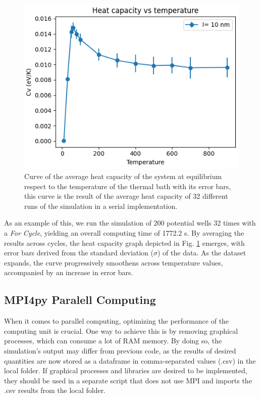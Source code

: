 \documentclass[%
 reprint,
 amsmath,amssymb,
 aps,
]{revtex4-2}
\begin{document}
\begin{figure}[!h]
    \centering
    \includegraphics[width = 0.7 \linewidth]{Cvser.png}
    \caption{Curve of the average heat capacity of the system at equilibrium respect to the temperature of the thermal bath with its error bars, this curve is the result of the average heat capacity of 32 different runs of the simulation in a serial implementation.}
    \label{fig:cvser}
\end{figure}

As an example of this, we run the simulation of 200 potential wells 32 times with a \textit{For Cycle}, yielding an overall computing time of 1772.2 s. By averaging the results across cycles, the heat capacity graph depicted in Fig. \ref{fig:cvser} emerges, with error bars derived from the standard deviation ($\sigma$) of the data. As the dataset expands, the curve progressively smoothens across temperature values, accompanied by an increase in error bars. 





\subsection{MPI4py Paralell Computing}
When it comes to parallel computing, optimizing the performance of the computing unit is crucial. One way to achieve this is by removing graphical processes, which can consume a lot of RAM memory. By doing so, the simulation's output may differ from previous code, as the results of desired quantities are now stored as a dataframe in comma-separated values (.csv) in the local folder. If graphical processes and libraries are desired to be implemented, they should be used in a separate script that does not use MPI and imports the .csv results from the local folder.
\end{document}
